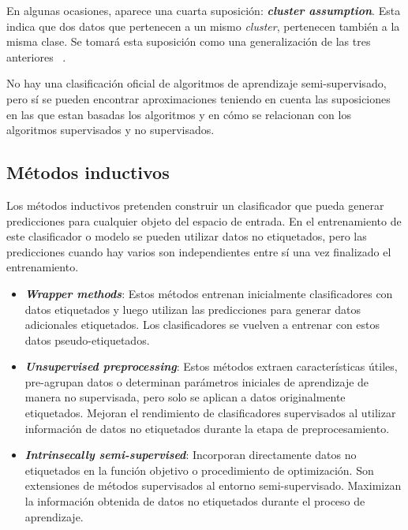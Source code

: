 En algunas ocasiones, aparece una cuarta suposición: \textit{\textbf{cluster assumption}}. Esta indica que dos datos que pertenecen a un mismo \textit{cluster}, pertenecen también a la misma clase. Se tomará esta suposición como una generalización de las tres anteriores ~\cite{Engelen:semi-supervised}.


No hay una clasificación oficial de algoritmos de aprendizaje semi-supervisado, pero sí se pueden encontrar aproximaciones teniendo en cuenta las suposiciones en las que estan basadas los algoritmos y en cómo se relacionan con los algoritmos supervisados y no supervisados.

\subsection{Métodos inductivos}
Los métodos inductivos pretenden construir un clasificador que pueda generar predicciones para cualquier objeto del espacio de entrada. En el entrenamiento de este clasificador o modelo se pueden utilizar datos no etiquetados, pero las predicciones cuando hay varios son independientes entre sí una vez finalizado el entrenamiento.
\begin{itemize}
	\item \textbf{\textit{Wrapper methods}}: Estos métodos entrenan inicialmente clasificadores con datos etiquetados y luego utilizan las predicciones para generar datos adicionales etiquetados. Los clasificadores se vuelven a entrenar con estos datos pseudo-etiquetados.
	\item \textbf{\textit{Unsupervised preprocessing}}: Estos métodos extraen características útiles, pre-agrupan datos o determinan parámetros iniciales de aprendizaje de manera no supervisada, pero solo se aplican a datos originalmente etiquetados. Mejoran el rendimiento de clasificadores supervisados al utilizar información de datos no etiquetados durante la etapa de preprocesamiento.
	\item \textbf{\textit{Intrinsecally semi-supervised}}: Incorporan directamente datos no etiquetados en la función objetivo o procedimiento de optimización. Son extensiones de métodos supervisados al entorno semi-supervisado. Maximizan la información obtenida de datos no etiquetados durante el proceso de aprendizaje.
	
\end{itemize}
